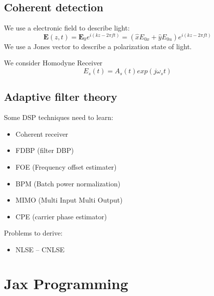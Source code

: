 \subsection{Coherent detection}
We use a electronic field to describe light:
$$
\mathbf{E}(z, t)=\mathbf{E}_{0} e^{i(k z-2 \pi f t)}=\left(\hat{x} E_{0 x}+\hat{y} E_{0 u}\right) e^{i(k z-2 \pi f t)}
$$
We use a Jones vector to describe a polarization state of light.

We consider Homodyne Receiver
$$
E_s(t) = A_s(t) exp(j\omega_s t)
$$

\subsection{Adaptive filter theory}



Some DSP techniques need to learn:
\begin{itemize}
    \item Coherent receiver
    \item FDBP (filter DBP)
    \item FOE (Frequency offset estimater)
    \item BPM (Batch power normalization)
    \item MIMO (Multi Input Multi Output)
    \item CPE (carrier phase estimator)
\end{itemize}

Problems to derive:
\begin{itemize}
    \item NLSE -- CNLSE
\end{itemize}


\section{Jax Programming}




